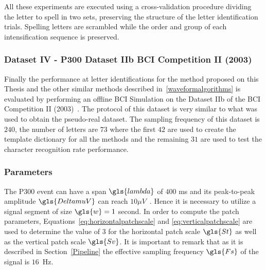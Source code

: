 All these experiments are executed using a cross-validation procedure dividing the letter to spell in two sets, preserving the structure of the letter identification trials. Spelling letters are scrambled while the order and group of each intensification sequence is preserved.

\subsubsection{Dataset IV - P300 Dataset IIb BCI Competition II (2003)}

Finally the performance at letter identifications for the method proposed on this Thesis and the other similar methods described in~\ref{waveformalgorithms} is evaluated by performing an offline BCI Simulation on the Dataset IIb of the BCI Competition II (2003)~\cite{Blankertz2002}.  The protocol of this dataset is very similar to what was used to obtain the pseudo-real dataset.  The sampling frequency of this dataset is $240$, the number of letters are $73$ where the first $42$ are used to create the template dictionary for all the methods and the remaining $31$ are used to test the character recognition rate performance.  


\subsubsection{Parameters}

The P300 event can have a span $\gls{lambda}$ of $400$ ms and its peak-to-peak amplitude $\gls{DeltamuV}$ can reach $ 10 \mu V $~\cite{Rao2013}.  Hence it is necessary to utilize a signal segment of size $\gls{w} = 1$ second.  In order to compute the patch parameters, Equations~\ref{eq:horizontalpatchscale} and \ref{eq:verticalpatchscale} are used to determine the value of $3$ for the horizontal patch scale $\gls{St}$ as well as the vertical patch scale $\gls{Sv}$.  It is important to remark that as it is described in Section~\ref{Pipeline} the effective sampling frequency $\gls{Fs}$ of the signal is $16$~$\si{\hertz}$.


%

